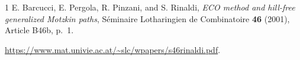 \documentclass[11pt,a4paper]{article}
\begin{document}
\begin{thebibliography}{1}
E. Barcucci, E. Pergola, R. Pinzani, and S. Rinaldi,
\emph{ECO method and hill-free generalized Motzkin paths},
S\'eminaire Lotharingien de Combinatoire \textbf{46} (2001),
Article B46b, p.~1.
\par\url{https://www.mat.univie.ac.at/~slc/wpapers/s46rinaldi.pdf}.
\end{thebibliography}
\end{document}
